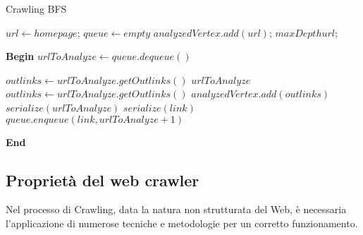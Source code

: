 \begin{algorithm}[H]
\caption{Crawling BFS}
\begin{algorithmic}

	\State $url\gets homepage$;	
	\State $queue\gets empty$ 
	\State $analyzedVertex.add(url)$;	
	\State $maxDepth url$;	
 	
 	\vspace*{+0.5cm}
 	
	\State \textbf{Begin}
		\State $urlToAnalyze\gets queue.dequeue()$
		
			\State $outlinks \gets urlToAnalyze.getOutlinks()$
		\Else
			\State $urlToAnalyze$
		\EndIf
			\State $outlinks \gets urlToAnalyze.getOutlinks()$
			\State $analyzedVertex.add(outlinks)$
			\State $serialize(urlToAnalyze)$
				\State $serialize(link)$
				\State $queue.enqueue(link, urlToAnalyze + 1)$
			\EndFor
		\EndIf
		
	\EndWhile
	\State \textbf{End}
\end{algorithmic}
\end{algorithm}

\subsection{Proprietà del web crawler}
Nel processo di Crawling, data la natura non strutturata del Web, è necessaria l'applicazione di numerose tecniche e metodologie per un corretto funzionamento.

